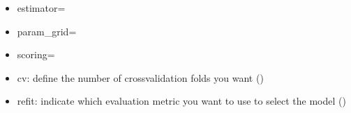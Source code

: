 \documentclass[letterpaper,10pt,english]{sphinxmanual}
\begin{document}
\begin{itemize}
\item {} 
\sphinxAtStartPar
estimator=

\item {} 
\sphinxAtStartPar
param\_grid=

\item {} 
\sphinxAtStartPar
scoring=

\item {} 
\sphinxAtStartPar
cv: define the number of cross\sphinxhyphen{}validation folds you want ()

\item {} 
\sphinxAtStartPar
refit: indicate which evaluation metric you want to use to select the model ()

\end{itemize}
\end{document}
